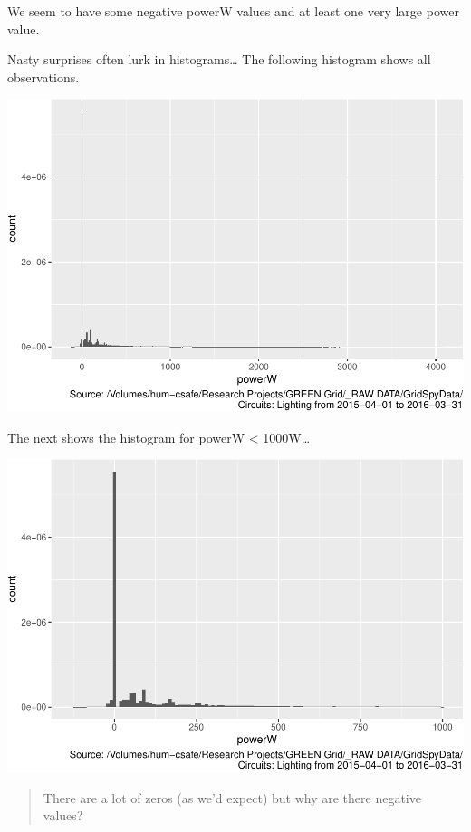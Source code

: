 \documentclass[]{article}
\begin{document}
We seem to have some negative powerW values and at least one very large
power value.

Nasty surprises often lurk in histograms\ldots{} The following histogram
shows all observations.

\includegraphics{nzGGHouseholdPowerDemandProfile_Lighting_2015-04-01_2016-03-31_files/figure-latex/histo full-1.pdf}

The next shows the histogram for powerW \textless{} 1000W\ldots{}

\includegraphics{nzGGHouseholdPowerDemandProfile_Lighting_2015-04-01_2016-03-31_files/figure-latex/histo power under 1000-1.pdf}

\begin{quote}
There are a lot of zeros (as we'd expect) but why are there negative
values?
\end{quote}
\end{document}
